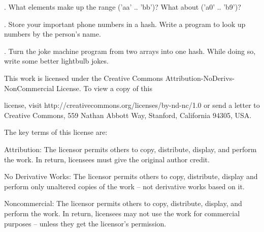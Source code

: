 \documentclass[a4paper,11pt]{book}
\begin{document}
\noindent 

.   What elements make up the range ('aa' .. 'bb')? What about ('a0' .. 'b9')?

\noindent 

.   Store your important phone numbers in a hash. Write a program to look up numbers by the person's name.

\noindent 

.   Turn the joke machine program from two arrays into one hash. While doing so, write some better lightbulb jokes.

\noindent  

\noindent  

\noindent  

\noindent  

\noindent 

\noindent 

\noindent 

\noindent This work is licensed under the Creative Commons Attribution-NoDerivs-NonCommercial License. To view a copy of this

\noindent license, visit http://creativecommons.org/licenses/by-nd-nc/1.0 or send a letter to Creative Commons, 559 Nathan Abbott Way, Stanford, California 94305, USA.

\noindent 

\noindent The key terms of this license are:

\noindent 

\noindent Attribution: The licensor permits others to copy, distribute, display, and perform the work. In return, licensees must give the original author credit.

\noindent 

\noindent No  Derivative  Works: The licensor permits others to copy, distribute, display and perform only unaltered copies of the work -- not derivative works based on it.

\noindent 

\noindent Noncommercial: The licensor permits others to copy, distribute, display, and perform the work. In return, licensees may not use the work for commercial purposes -- unless they get the licensor's permission.
\end{document}
